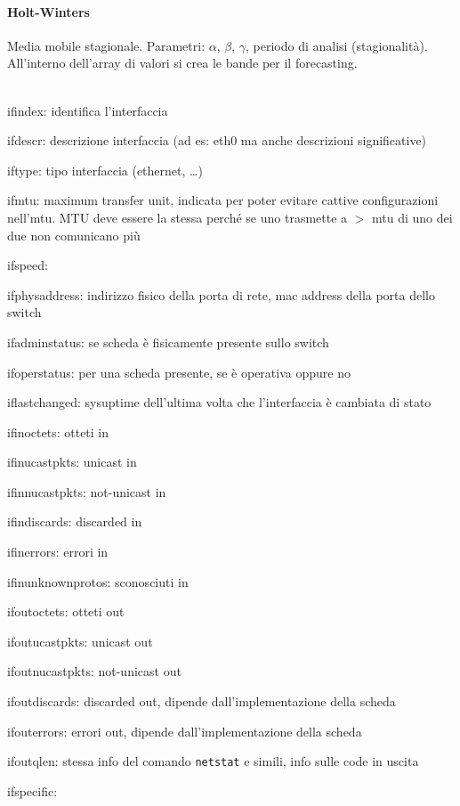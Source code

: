 \documentclass[10pt]{book}
\begin{document}
\paragraph{Holt-Winters} Media mobile stagionale. Parametri: $\alpha$, $\beta$, $\gamma$, periodo di analisi (stagionalità).
All'interno dell'array di valori si crea le bande per il forecasting.\\\\
\begin{list}{}{Tutti valori letti dalla scheda di rete}
	\item ifindex: identifica l'interfaccia
	\item ifdescr: descrizione interfaccia (ad es: eth0 ma anche descrizioni significative)
	\item iftype: tipo interfaccia (ethernet, \ldots)
	\item ifmtu: maximum transfer unit, indicata per poter evitare cattive configurazioni nell'mtu. MTU deve essere la stessa perché se uno trasmette a $>$ mtu di uno dei due non comunicano più
	\item ifspeed: 
	\item ifphysaddress: indirizzo fisico della porta di rete, mac address della porta dello switch
	\item ifadminstatus: se scheda è fisicamente presente sullo switch
	\item ifoperstatus: per una scheda presente, se è operativa oppure no
	\item iflastchanged: sysuptime dell'ultima volta che l'interfaccia è cambiata di stato
	\item ifinoctets: otteti in
	\item ifinucastpkts: unicast in
	\item ifinnucastpkts: not-unicast in
	\item ifindiscards: discarded in
	\item ifinerrors: errori in
	\item ifinunknownprotos: sconosciuti in
	\item ifoutoctets: otteti out
	\item ifoutucastpkts: unicast out
	\item ifoutnucastpkts: not-unicast out
	\item ifoutdiscards: discarded out, dipende dall'implementazione della scheda
	\item ifouterrors: errori out, dipende dall'implementazione della scheda
	\item ifoutqlen: stessa info del comando \texttt{netstat} e simili, info sulle code in uscita
	\item ifspecific:
\end{list}
\end{document}
